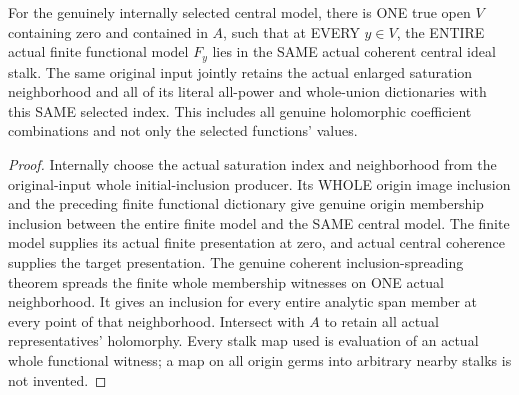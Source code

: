 \begin{theorem}
\label{hir:relative-normal-deformation-finite-central-spread}
\leanok
{}
For the genuinely internally selected central model, there is ONE true open
$V$ containing zero and contained in $A$, such that at EVERY $y\in V$,
the ENTIRE actual finite functional model $F_y$ lies in the SAME actual
coherent central ideal stalk. The same original input jointly retains the
actual enlarged saturation neighborhood and all of its literal all-power
and whole-union dictionaries with this SAME selected index.
This includes all genuine holomorphic
coefficient combinations and not only the selected functions' values.
\end{theorem}
\begin{proof}
Internally choose the actual saturation index and neighborhood from the
original-input whole initial-inclusion producer. Its WHOLE origin image
inclusion and the preceding finite functional dictionary give genuine
origin membership inclusion between the entire finite model and the SAME
central model. The finite model supplies its actual finite presentation
at zero, and actual central coherence supplies the target presentation.
The genuine coherent inclusion-spreading theorem spreads the finite whole
membership witnesses on ONE actual neighborhood. It gives an inclusion for
every entire analytic span member at every point of that neighborhood.
Intersect with $A$ to retain all actual representatives' holomorphy. Every
stalk map used is evaluation of an actual whole functional witness; a map
on all origin germs into arbitrary nearby stalks is not invented.
\end{proof}

